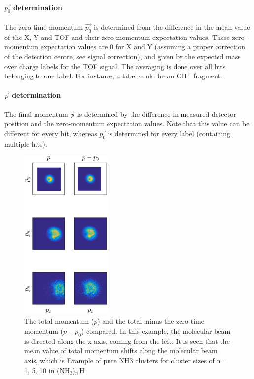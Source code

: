 \paragraph{$\vec{p_0}$ determination}
The zero-time momentum $\vec{p_0}$ is determined from the difference in the mean value of the X, Y and TOF and their zero-momentum expectation values. These zero-momentum expectation values are 0 for X and Y (assuming a proper correction of the detection centre, see signal correction), and given by the expected mass over charge labels for the TOF signal. The averaging is done over all hits belonging to one label. For instance, a label could be an OH$^+$ fragment. 

\paragraph{$\vec{p}$ determination}
The final momentum $\vec{p}$ is determined by the difference in measured detector position and the zero-momentum expectation values. Note that this value can be different for every hit, whereas $\vec{p_0}$ is determined for every label (containing multiple hits). 

\begin{figure}[H]
   \centering
    \centerline{\includegraphics[width=0.4\textwidth]{Graphics/pxpy_hist.eps}}
\caption{The total momentum ($p$) and the total minus the zero-time momentum ($p - p_0$) compared. In this example, the molecular beam is directed along the x-axis, coming from the left. It is seen that the mean value of total momentum shifts along the molecular beam axis, which is  
Example of pure NH3 clusters for cluster sizes of n = 1, 5, 10 in (NH$_3$)$_n^+$H}
\end{figure}

